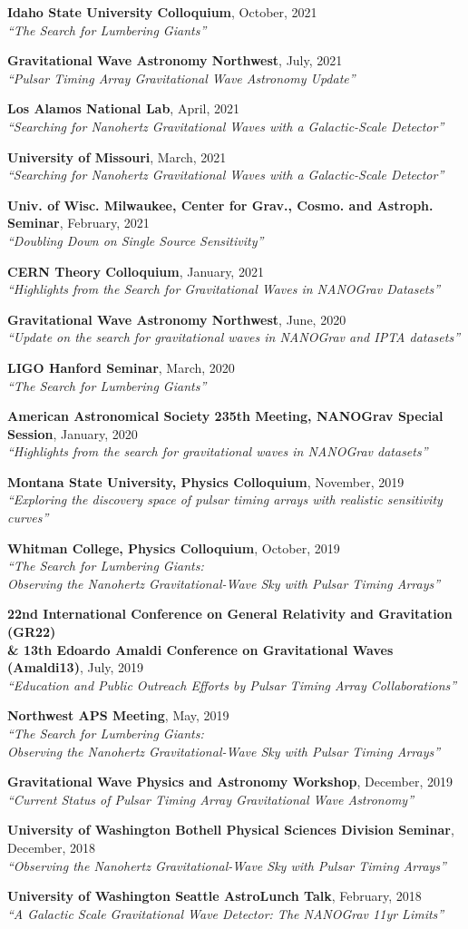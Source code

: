 \documentclass[11pt,letterpaper,sans,unicode]{moderncv}
\newcommand{\invtalkitem}[3]{\item \textbf{#1}, \hfill{#2} \\ \textit{\color{color1}``#3''} \vspace{-0.1cm}} %
\begin{document}
\begin{etaremune}[leftmargin=8mm]
\small
\invtalkitem{Idaho State University Colloquium}{October, 2021}{The Search for Lumbering Giants}
\invtalkitem{Gravitational Wave Astronomy Northwest}{July, 2021}{Pulsar Timing Array Gravitational Wave Astronomy Update}
\invtalkitem{Los Alamos National Lab}{April, 2021}{Searching for Nanohertz Gravitational Waves with a Galactic-Scale Detector}
\invtalkitem{University of Missouri}{March, 2021}{Searching for Nanohertz Gravitational Waves with a Galactic-Scale Detector}
\invtalkitem{Univ. of Wisc. Milwaukee, Center for Grav., Cosmo. and Astroph. Seminar}{February, 2021}{Doubling Down on Single Source Sensitivity}
\invtalkitem{CERN Theory Colloquium}{January, 2021}{Highlights from the Search for Gravitational Waves in NANOGrav Datasets}
\invtalkitem{Gravitational Wave Astronomy Northwest}{June, 2020}{Update on the search for gravitational waves in NANOGrav and IPTA datasets}
\invtalkitem{LIGO Hanford Seminar}{March, 2020}{The Search for Lumbering Giants}
\invtalkitem{American Astronomical Society 235th Meeting, NANOGrav Special Session}{January, 2020}{Highlights from the search for gravitational waves in NANOGrav datasets}
\invtalkitem{Montana State University, Physics Colloquium}{November, 2019}{Exploring the discovery space of pulsar timing arrays with realistic sensitivity curves}
\invtalkitem{Whitman College, Physics Colloquium}{October, 2019}{The Search for Lumbering Giants:\\ Observing the Nanohertz Gravitational-Wave Sky with Pulsar Timing Arrays}
\invtalkitem{22nd International Conference on General Relativity and Gravitation (GR22)\\ \& 13th Edoardo Amaldi Conference on Gravitational Waves (Amaldi13)}{July, 2019}{Education and Public Outreach Efforts by Pulsar Timing Array Collaborations}
\invtalkitem{Northwest APS Meeting}{May, 2019}{The Search for Lumbering Giants:\\Observing the Nanohertz Gravitational-Wave Sky with Pulsar Timing Arrays}
\invtalkitem{Gravitational Wave Physics and Astronomy Workshop}{December, 2019}{Current Status of Pulsar Timing Array Gravitational Wave Astronomy}
\invtalkitem{University of Washington Bothell Physical Sciences Division Seminar}{December, 2018}{Observing the Nanohertz Gravitational-Wave Sky with Pulsar Timing Arrays}
\invtalkitem{University of Washington Seattle AstroLunch Talk}{February, 2018}{A Galactic Scale Gravitational Wave Detector: The NANOGrav 11yr Limits}


\end{etaremune}
\end{document}
